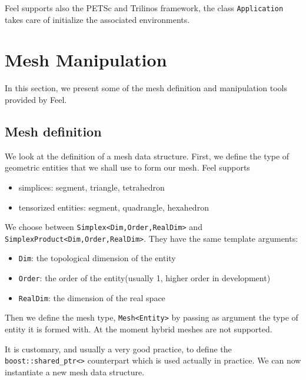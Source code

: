 \documentclass[a4paper]{book}
\newcommand{\feel}{Feel\xspace}
\begin{document}

\feel supports also the PETSc and Trilinos framework, the class
\lstinline!Application! takes care of
initialize the associated environments.

\section{Mesh Manipulation}
\label{sec:mesh-manipulation}

In this section, we present some of the mesh definition and
manipulation tools provided by \feel.

\subsection{Mesh definition}

We look at the definition of a mesh data structure. First, we define
the type of geometric entities that we shall use to form our mesh. \feel supports
\begin{itemize}
\item simplices: segment, triangle, tetrahedron
\item tensorized entities: segment, quadrangle, hexahedron
\end{itemize}

We choose between \lstinline!Simplex<Dim,Order,RealDim>!  and
\lstinline!SimplexProduct<Dim,Order,RealDim>!. They have the same
template arguments:
\begin{itemize}
\item \lstinline!Dim!: the topological dimension of the entity
\item \lstinline!Order!: the order of the entity(usually 1, higher order in development)
\item \lstinline!RealDim!: the dimension of the real space
\end{itemize}




Then we define the mesh type, \lstinline!Mesh<Entity>! by passing as
argument the type of entity it is formed with. At the moment hybrid
meshes are not supported.



It is customary, and usually a very good practice, to define the
\lstinline!boost::shared_ptr<>!  counterpart which is used actually in
practice. We can now instantiate a new mesh data structure.
\end{document}
